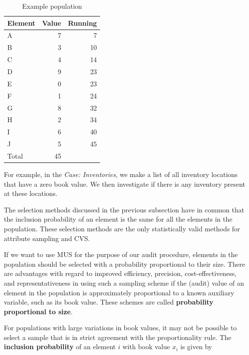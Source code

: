 \begin{table}[htbp]
\centering
\begin{tabular}{l r r}
\toprule
Element & \multicolumn{1}{c}{Value} & \multicolumn{1}{c}{Running} \\
\midrule
A & 7 & 7 \\
B & 3 & 10 \\
C & 4 & 14 \\
D & 9 & 23 \\
E & 0 & 23 \\
F & 1 & 24 \\
G & 8 & 32 \\
H & 2 & 34 \\
I & 6 & 40 \\
J & 5 & 45 \\
\midrule
Total & 45 & \\
\bottomrule
\end{tabular}
\caption{Example population}
\label{tab:example_pop_2}
\end{table}

For example, in the \emph{Case: Inventories}, we make a list of all inventory locations that have a zero book value. We then investigate if there is any inventory present at these locations.

\bigskip
The selection methods discussed in the previous subsection have in common that the inclusion probability of an element is the same for all the elements in the population. These selection methods are the only statistically valid methods for attribute sampling and CVS.

If we want to use MUS for the purpose of our audit procedure, elements in the population should be selected with a probability proportional to their size. There are advantages with regard to improved efficiency, precision, cost-effectiveness, and representativeness in using such a sampling scheme if the (audit) value of an element in the population is approximately proportional to a known auxiliary variable, such as its book value. These schemes are called \textbf{probability proportional to size}.

For populations with large variations in book values, it may not be possible to select a sample that is in strict agreement with the proportionality rule. The \textbf{inclusion probability} of an element $i$ with book value $x_i$ is given by

